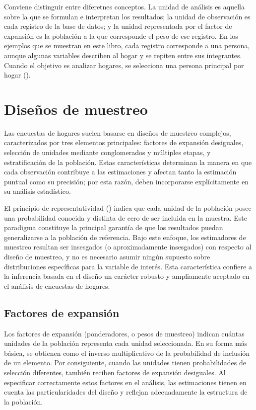 \documentclass[
  spanish,
  11pt,
  letterpaper,
  oneside,
  open=any]{scrbook}
\begin{document}
Conviene distinguir entre diferetnes conceptos. La unidad de análisis es
aquella sobre la que se formulan e interpretan los resultados; la unidad
de observación es cada registro de la base de datos; y la unidad
representada por el factor de expansión es la población a la que
corresponde el peso de ese registro. En los ejemplos que se muestran en
este libro, cada registro corresponde a una persona, aunque algunas
variables describen al hogar y se repiten entre sus integrantes. Cuando
el objetivo es analizar hogares, se selecciona una persona principal por
hogar ().

\section{Diseños de muestreo}\label{DisenosMuestreo}

Las encuestas de hogares suelen basarse en diseños de muestreo
complejos, caracterizados por tres elementos principales: factores de
expansión desiguales, selección de unidades mediante conglomerados y
múltiples etapas, y estratificación de la población. Estas
características determinan la manera en que cada observación contribuye
a las estimaciones y afectan tanto la estimación puntual como su
precisión; por esta razón, deben incorporarse explícitamente en su
análisis estadístico.

El principio de representatividad
() indica que cada unidad de
la población posee una probabilidad conocida y distinta de cero de ser
incluida en la muestra. Este paradigma constituye la principal garantía
de que los resultados puedan generalizarse a la población de referencia.
Bajo este enfoque, los estimadores de muestreo resultan ser insesgados
(o aproximadamente insesgados) con respecto al diseño de muestreo, y no
es necesario asumir ningún supuesto sobre distribuciones específicas
para la variable de interés. Esta característica confiere a la
inferencia basada en el diseño un carácter robusto y ampliamente
aceptado en el análisis de encuestas de hogares.

\subsection{Factores de expansión}\label{factores-de-expansiuxf3n}

Los factores de expansión (ponderadores, o pesos de muestreo) indican
cuántas unidades de la población representa cada unidad seleccionada. En
su forma más básica, se obtienen como el inverso multiplicativo de la
probabilidad de inclusión de un elemento. Por consiguiente, cuando las
unidades tienen probabilidades de selección diferentes, también reciben
factores de expansión desiguales. Al especificar correctamente estos
factores en el análisis, las estimaciones tienen en cuenta las
particularidades del diseño y reflejan adecuadamente la estructura de la
población.
\end{document}
